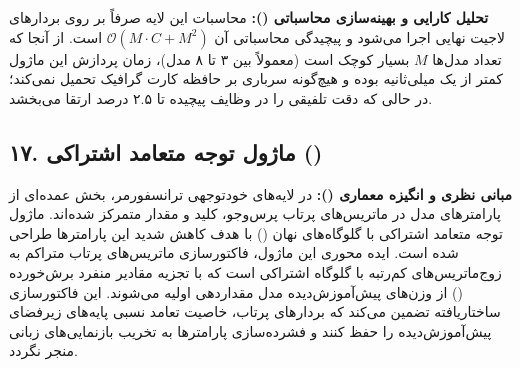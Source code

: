 \textbf{تحلیل کارایی و بهینه‌سازی محاسباتی ():}
محاسبات این لایه صرفاً بر روی بردارهای لاجیت نهایی اجرا می‌شود و پیچیدگی محاسباتی آن $\mathcal{O}(M \cdot C + M^2)$ است. از آنجا که تعداد مدل‌ها $M$ بسیار کوچک است (معمولاً بین ۳ تا ۸ مدل)، زمان پردازش این ماژول کمتر از یک میلی‌ثانیه بوده و هیچ‌گونه سرباری بر حافظه  کارت گرافیک تحمیل نمی‌کند؛ در حالی که دقت تلفیقی را در وظایف پیچیده تا ۲.۵ درصد ارتقا می‌بخشد.



\subsection*{۱۷. ماژول توجه متعامد اشتراکی  ()}

\textbf{مبانی نظری و انگیزه معماری ():}
در لایه‌های خودتوجهی ترانسفورمر، بخش عمده‌ای از پارامترهای مدل در ماتریس‌های پرتاب پرس‌وجو، کلید و مقدار متمرکز شده‌اند. ماژول توجه متعامد اشتراکی با گلوگاه‌های نهان () با هدف کاهش شدید این پارامترها طراحی شده است. ایده محوری این ماژول، فاکتورسازی ماتریس‌های پرتاب متراکم به زوج‌ماتریس‌های کم‌رتبه با گلوگاه اشتراکی است که با تجزیه مقادیر منفرد برش‌خورده () از وزن‌های پیش‌آموزش‌دیده مدل مقداردهی اولیه می‌شوند.
این فاکتورسازی ساختاریافته تضمین می‌کند که بردارهای پرتاب، خاصیت تعامد نسبی پایه‌های زیرفضای پیش‌آموزش‌دیده را حفظ کنند و فشرده‌سازی پارامترها به تخریب بازنمایی‌های زبانی منجر نگردد.


